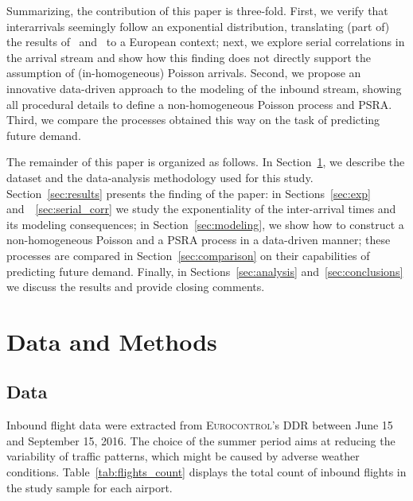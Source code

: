 \documentclass[draft,review]{elsarticle}
\begin{document}
Summarizing, the contribution of this paper is three-fold.
First, we verify that interarrivals seemingly follow an exponential distribution, translating (part of) the results of~\cite{willemain2004statistical} and~\citep{gwiggner2014data} to a European context; next, we explore serial correlations in the arrival stream and show how this finding does not directly support the assumption of (in-homogeneous) Poisson arrivals. Second, we propose an innovative data-driven approach to the modeling of the inbound stream, showing all procedural details to define a non-homogeneous Poisson process and \ac{PSRA}. Third, we compare the processes obtained this way on the task of predicting future demand.

The remainder of this paper is organized as follows.
In Section~\ref{sec:data_methods}, we describe the dataset and the data-analysis methodology used for this study.
Section~\ref{sec:results} presents the finding of the paper:
in Sections~\ref{sec:exp} and~~\ref{sec:serial_corr} we study the exponentiality of the inter-arrival times and its modeling consequences; in Section~\ref{sec:modeling}, we show how to construct a non-homogeneous Poisson and a \ac{PSRA} process in a data-driven manner; these processes are compared in Section~\ref{sec:comparison} on their capabilities of predicting future demand.
Finally, in Sections~\ref{sec:analysis} and~\ref{sec:conclusions} we discuss the results and provide closing comments.

\section{Data and Methods}\label{sec:data_methods}

\subsection{Data}\label{sec:dm_data}

Inbound flight data were extracted from \textsc{Eurocontrol}'s \ac{DDR} between June 15 and September 15, 2016.
The choice of the summer period aims at reducing the variability of traffic patterns, which might be caused by adverse weather conditions.
Table~\ref{tab:flights_count} displays the total count of inbound flights in the study sample for each airport.
\end{document}
